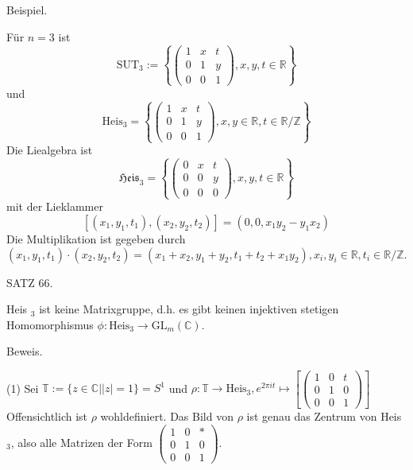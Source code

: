\documentclass[10pt, letterpaper]{article}
\begin{document}
Beispiel. 

Für $n=3$ ist
$$
\mathrm{SUT}_{3}:=\left\{\left(\begin{array}{ccc}
1 & x & t \\
0 & 1 & y \\
0 & 0 & 1
\end{array}\right), x, y, t \in \mathbb{R}\right\}
$$
und
$$
\mathrm{Heis}_{3}=\left\{\left(\begin{array}{ccc}
1 & x & t \\
0 & 1 & y \\
0 & 0 & 1
\end{array}\right), x, y \in \mathbb{R}, t \in \mathbb{R} / \mathbb{Z}\right\}
$$
Die Liealgebra ist
$$
\mathfrak{H e i s}_{3}=\left\{\left(\begin{array}{ccc}
0 & x & t \\
0 & 0 & y \\
0 & 0 & 0
\end{array}\right), x, y, t \in \mathbb{R}\right\}
$$
mit der Lieklammer
$$
\left[\left(x_{1}, y_{1}, t_{1}\right),\left(x_{2}, y_{2}, t_{2}\right)\right]=\left(0,0, x_{1} y_{2}-y_{1} x_{2}\right)
$$
Die Multiplikation ist gegeben durch
$$
\left(x_{1}, y_{1}, t_{1}\right) \cdot\left(x_{2}, y_{2}, t_{2}\right)=\left(x_{1}+x_{2}, y_{1}+y_{2}, t_{1}+t_{2}+x_{1} y_{2}\right), x_{i}, y_{i} \in \mathbb{R}, t_{i} \in \mathbb{R} / \mathbb{Z} .
$$



SATZ 66. 

Heis ${ }_{3}$ ist keine Matrixgruppe, d.h. es gibt keinen injektiven stetigen Homomorphismus $\phi: \mathrm{Heis}_{3} \rightarrow \mathrm{GL}_{m}(\mathbb{C})$.

Beweis. 

(1) Sei $\mathbb{T}:=\{z \in \mathbb{C}| | z \mid=1\}=S^{1}$ und $\rho: \mathbb{T} \rightarrow \mathrm{Heis}_{3}, e^{2 \pi i t} \mapsto\left[\left(\begin{array}{lll}1 & 0 & t \\ 0 & 1 & 0 \\ 0 & 0 & 1\end{array}\right)\right]$ Offensichtlich ist $\rho$ wohldefiniert. Das Bild von $\rho$ ist genau das Zentrum von Heis ${ }_{3}$, also alle Matrizen der Form $\left(\begin{array}{lll}1 & 0 & * \\ 0 & 1 & 0 \\ 0 & 0 & 1\end{array}\right)$.
\end{document}
